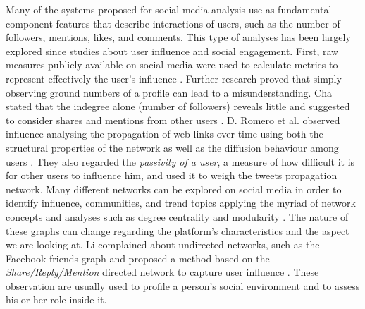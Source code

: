 Many of the systems proposed for social media analysis use as fundamental component features that describe interactions of users, such as the number of followers, mentions, likes, and comments.
This type of analyses has been largely explored since studies about user influence and social engagement. First, raw measures publicly available on social media were used to calculate metrics to represent effectively the user's influence \cite{oviedo2014metric}.
Further research proved that simply observing ground numbers of a profile can lead to a misunderstanding. Cha stated that the indegree alone (number of followers) reveals little and suggested to consider shares and mentions from other users \cite{cha2010measuring}.
D. Romero et al. observed influence analysing the propagation of web links over time using both the structural properties of the network as well as the diffusion behaviour among users \cite{romero2011influence}. They also regarded the \emph{passivity of a user}, a measure of how difficult it is for other users to influence him, and used it to weigh the tweets propagation network. 
Many different networks can be explored on social media in order to identify influence, communities, and trend topics applying the myriad of network concepts and analyses such as degree centrality and modularity \cite{chae2015insights}. 
The nature of these graphs can change regarding the platform's characteristics and the aspect we are looking at. Li complained about undirected networks, such as the Facebook friends graph and proposed a method based on the \emph{Share/Reply/Mention} directed network to capture user influence \cite{li2014social}.
These observation are usually used to profile a person's social environment and to assess his or her role inside it. 

